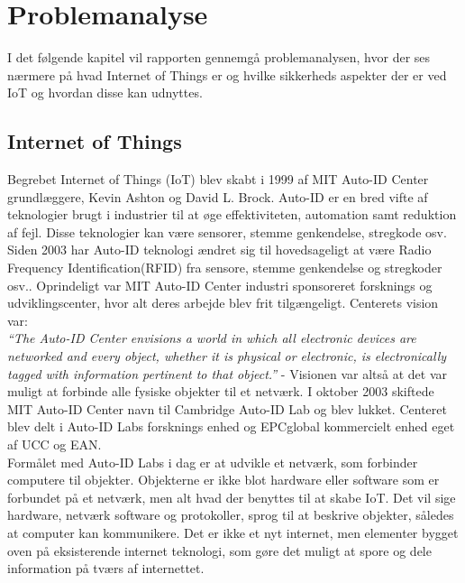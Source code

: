 \chapter{Problemanalyse}

    I det følgende kapitel vil rapporten gennemgå problemanalysen, hvor der  ses nærmere på hvad Internet of Things er og hvilke sikkerheds aspekter der er ved IoT og hvordan disse kan udnyttes.
    
    \section{Internet of Things}
        Begrebet Internet of Things (IoT) blev skabt i 1999 af MIT Auto-ID Center grundlæggere, Kevin Ashton og David L. Brock.\autocite{Hashmi2017} Auto-ID er en bred vifte af teknologier brugt i industrier til at øge effektiviteten, automation samt reduktion af fejl. Disse teknologier kan være sensorer, stemme genkendelse, stregkode osv.
        Siden 2003 har Auto-ID teknologi ændret sig til hovedsageligt at være Radio Frequency Identification(RFID) fra sensore, stemme genkendelse og stregkoder osv.\autocite{Sundmaeker2010}. Oprindeligt var MIT Auto-ID Center industri sponsoreret forsknings og udviklingscenter, hvor alt deres arbejde blev frit tilgængeligt. Centerets vision var:\\
        \textit{``The Auto-ID Center envisions a world in which all electronic devices are networked and every object, whether it is physical or electronic, is electronically tagged with information pertinent to that object.''} -\autocite[Kapitel 2,p. ~4]{Sarma2001} Visionen var altså at det var muligt at forbinde alle fysiske objekter til et netværk. 
        I oktober 2003 skiftede MIT Auto-ID Center navn til Cambridge Auto-ID Lab og blev lukket. Centeret blev delt i Auto-ID Labs forsknings enhed og EPCglobal kommercielt enhed eget af UCC og EAN.\autocite{Sundmaeker2010}\\
        Formålet med Auto-ID Labs i dag er at udvikle et netværk, som forbinder computere til objekter. Objekterne er ikke blot hardware eller software som er forbundet på et netværk, men alt hvad der benyttes til at skabe IoT. Det vil sige hardware, netværk software og protokoller, sprog til at beskrive objekter, således at computer kan kommunikere. Det er ikke et nyt internet, men elementer bygget oven på eksisterende internet teknologi, som gøre det muligt at spore og dele information på tværs af internettet.\autocite{Sundmaeker2010} \\
